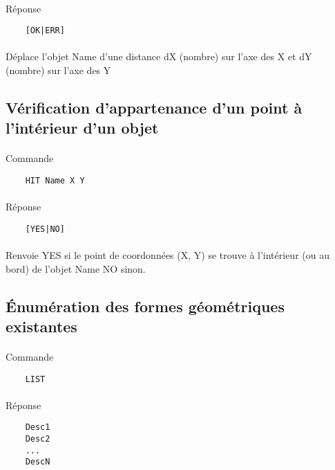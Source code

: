 \documentclass[a4paper, 12pts]{article}
\begin{document}
\paragraph{}
Réponse
\begin{lstlisting}
	[OK|ERR]
\end{lstlisting}
\paragraph{}
Déplace l'objet Name d'une distance dX (nombre) sur l'axe des X et dY (nombre) sur l'axe des Y

\subsection{Vérification d’appartenance d'un point à l'intérieur d'un objet}
 \paragraph{}
Commande
\begin{lstlisting}
	HIT Name X Y
\end{lstlisting}
\paragraph{}
Réponse
\begin{lstlisting}
	[YES|NO]
\end{lstlisting}
\paragraph{}
Renvoie YES si le point de coordonnées (X, Y) se trouve à l'intérieur (ou au bord) de l'objet Name NO sinon.

\subsection{Énumération des formes géométriques existantes}
 \paragraph{}
Commande
\begin{lstlisting}
	LIST
\end{lstlisting}
\paragraph{}
Réponse
\begin{lstlisting}
	Desc1
	Desc2
	...
	DescN
\end{lstlisting}
\end{document}
